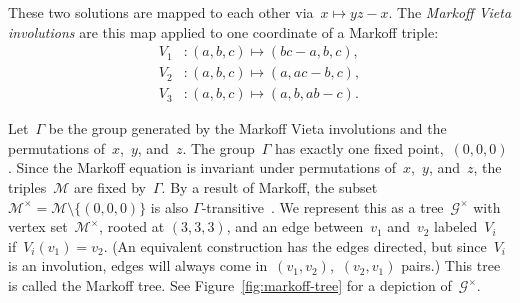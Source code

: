 \documentclass{article}
\theoremstyle{definition}
\theoremstyle{remark}
\begin{document}
These two solutions are mapped to each other via~$x \mapsto yz - x$.
The \textit{Markoff Vieta involutions} are this map applied to one coordinate of a Markoff triple:
\begin{align*}
    V_1 &\colon (a, b, c) \mapsto (bc - a, b, c), \\
    V_2 &\colon (a, b, c) \mapsto (a, ac - b, c), \\
    V_3 &\colon (a, b, c) \mapsto (a, b, ab - c).
\end{align*}

Let~$\Gamma$ be the group generated by the Markoff Vieta involutions and the permutations of~$x$,~$y$, and~$z$.
The group~$\Gamma$ has exactly one fixed point,~$(0, 0, 0)$.
Since the Markoff equation is invariant under permutations of~$x$,~$y$, and~$z$, the triples~$\mathcal{M}$ are fixed by~$\Gamma$.
By a result of Markoff, the subset~$\mathcal{M}^\times = \mathcal{M} \setminus \{(0, 0, 0)\}$ is also $\Gamma$-transitive~\cite{markoff}.
We represent this as a tree~$\mathcal{G}^\times$ with vertex set~$\mathcal{M}^\times$, rooted at $(3, 3, 3)$, and an edge between~$v_1$ and~$v_2$ labeled~$V_i$ if~$V_i(v_1) = v_2$.
(An equivalent construction has the edges directed, but since~$V_i$ is an involution, edges will always come in~$(v_1, v_2)$,~$(v_2, v_1)$ pairs.)
This tree is called the Markoff tree.
See Figure~\ref{fig:markoff-tree} for a depiction of~$\mathcal{G}^\times$.
\end{document}
